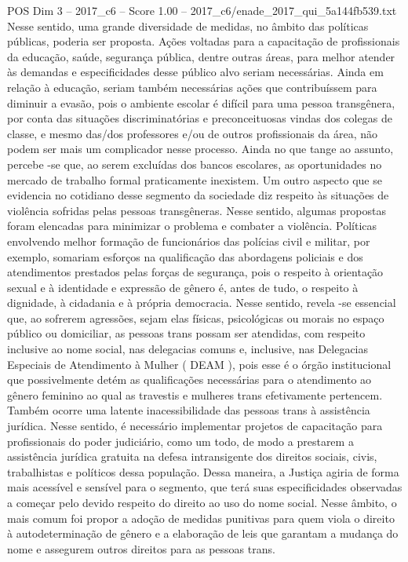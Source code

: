 \begin{textsample}{POS Dim 3 – 2017\_c6 – Score 1.00 – 2017\_c6/enade\_2017\_qui\_5a144fb539.txt}
Nesse sentido, uma grande diversidade de medidas, no âmbito das políticas públicas, poderia ser proposta.
Ações voltadas para a capacitação de profissionais da educação, saúde, segurança pública, dentre outras áreas, para melhor atender às demandas e especificidades desse público alvo seriam necessárias.
Ainda em relação à educação, seriam também necessárias ações que contribuíssem para diminuir a evasão, pois o ambiente escolar é difícil para uma pessoa transgênera, por conta das situações discriminatórias e preconceituosas vindas dos colegas de classe, e mesmo das/dos professores e/ou de outros profissionais da área, não podem ser mais um complicador nesse processo.
Ainda no que tange ao assunto, percebe -se que, ao serem excluídas dos bancos escolares, as oportunidades no mercado de trabalho formal praticamente inexistem.
Um outro aspecto que se evidencia no cotidiano desse segmento da sociedade diz respeito às situações de violência sofridas pelas pessoas transgêneras.
Nesse sentido, algumas propostas foram elencadas para minimizar o problema e combater a violência.
Políticas envolvendo melhor formação de funcionários das polícias civil e militar, por exemplo, somariam esforços na qualificação das abordagens policiais e dos atendimentos prestados pelas forças de segurança, pois o respeito à orientação sexual e à identidade e expressão de gênero é, antes de tudo, o respeito à dignidade, à cidadania e à própria democracia.
Nesse sentido, revela -se essencial que, ao sofrerem agressões, sejam elas físicas, psicológicas ou morais no espaço público ou domiciliar, as pessoas trans possam ser atendidas, com respeito inclusive ao nome social, nas delegacias comuns e, inclusive, nas Delegacias Especiais de Atendimento à Mulher ( DEAM ), pois esse é o órgão institucional que possivelmente detém as qualificações necessárias para o atendimento ao gênero feminino ao qual as travestis e mulheres trans efetivamente pertencem.
Também ocorre uma latente inacessibilidade das pessoas trans à assistência jurídica.
Nesse sentido, é necessário implementar projetos de capacitação para profissionais do poder judiciário, como um todo, de modo a prestarem a assistência jurídica gratuita na defesa intransigente dos direitos sociais, civis, trabalhistas e políticos dessa população.
Dessa maneira, a Justiça agiria de forma mais acessível e sensível para o segmento, que terá suas especificidades observadas a começar pelo devido respeito do direito ao uso do nome social.
Nesse âmbito, o mais comum foi propor a adoção de medidas punitivas para quem viola o direito à autodeterminação de gênero e a elaboração de leis que garantam a mudança do nome e assegurem outros direitos para as pessoas trans.

\end{textsample}
